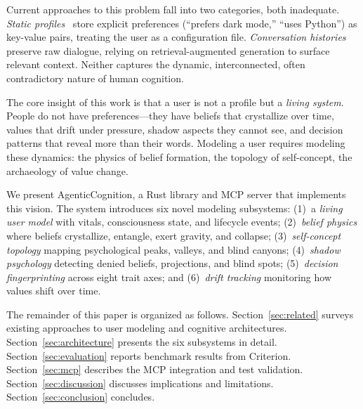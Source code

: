 \documentclass[10pt, twocolumn]{article}
\begin{document}
Current approaches to this problem fall into two categories, both inadequate. \emph{Static profiles}~\cite{brusilovsky2001adaptive} store explicit preferences (``prefers dark mode,'' ``uses Python'') as key-value pairs, treating the user as a configuration file. \emph{Conversation histories}~\cite{packer2023memgpt} preserve raw dialogue, relying on retrieval-augmented generation to surface relevant context. Neither captures the dynamic, interconnected, often contradictory nature of human cognition.

The core insight of this work is that a user is not a profile but a \emph{living system}. People do not have preferences---they have beliefs that crystallize over time, values that drift under pressure, shadow aspects they cannot see, and decision patterns that reveal more than their words. Modeling a user requires modeling these dynamics: the physics of belief formation, the topology of self-concept, the archaeology of value change.

We present AgenticCognition, a Rust library and MCP server that implements this vision. The system introduces six novel modeling subsystems: (1)~a \emph{living user model} with vitals, consciousness state, and lifecycle events; (2)~\emph{belief physics} where beliefs crystallize, entangle, exert gravity, and collapse; (3)~\emph{self-concept topology} mapping psychological peaks, valleys, and blind canyons; (4)~\emph{shadow psychology} detecting denied beliefs, projections, and blind spots; (5)~\emph{decision fingerprinting} across eight trait axes; and (6)~\emph{drift tracking} monitoring how values shift over time.

The remainder of this paper is organized as follows. Section~\ref{sec:related} surveys existing approaches to user modeling and cognitive architectures. Section~\ref{sec:architecture} presents the six subsystems in detail. Section~\ref{sec:evaluation} reports benchmark results from Criterion. Section~\ref{sec:mcp} describes the MCP integration and test validation. Section~\ref{sec:discussion} discusses implications and limitations. Section~\ref{sec:conclusion} concludes.
\end{document}

